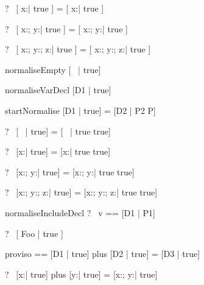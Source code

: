 \begin{zed}
  \vdash?~ [ x:\nat | true ] = [ x:\nat | true ]
\end{zed}

\begin{zed}
  \vdash?~ [ x:\nat; y:\nat | true ] = [ x:\nat; y:\nat | true ]
\end{zed}

\begin{zed}
  \vdash?~ [ x:\nat; y:\nat ; z:\nat | true ] =
           [ x:\nat; y:\nat ; z:\nat | true ]
\end{zed}



\begin{zedrule}{normaliseEmpty}
   [~ | true] \unfoldsTo [~ | true]
\end{zedrule}

\begin{zedrule}{normaliseVarDecl}
   [D1 | true] \unfoldsTo [D2 | P2]
\derives
   [v:E; D1 | true] \unfoldsTo [v:E; D2 | P2]
\end{zedrule}

\begin{zedrule}{startNormalise}
   [D1 | true] \unfoldsTo [D2 | P2]
\derives
   [D1 | P] = [D2 | P2 \land P]
\end{zedrule}

\begin{zed}
  \vdash?~ [~ | true] = [~ | true \land true]
\end{zed}

\begin{zed}
  \vdash?~ [x:\nat | true] = [x:\nat | true \land true]
\end{zed}

\begin{zed}
  \vdash?~ [x:\nat ; y:\nat | true] = [x:\nat ; y:\nat | true \land true]
\end{zed}

\begin{zed}
  \vdash?~ [x:\nat ; y:\nat ; z:\nat | true] =
           [x:\nat ; y:\nat ; z:\nat | true \land true]
\end{zed}



\begin{zedrule}{normaliseIncludeDecl}
   \proviso ?~ v == [D1 | P1] \\
\derives
   [v; D | true] \unfoldsTo [D1 | P1 \land P2]
\end{zedrule}

\begin{zed}
  \vdash?~ [ Foo | true ] 
\end{zed}


\begin{zedrule}{proviso}
  \proviso [D3 | true] == [D1 | true] \schemamerge [D2 | true]
\derives
  [D1 | true] plus [D2 | true] = [D3 | true]
\end{zedrule}

\begin{zed}
  \vdash?~ [x:\nat | true] plus [y:\nat | true] = [x:\nat; y:\nat | true]
\end{zed}
